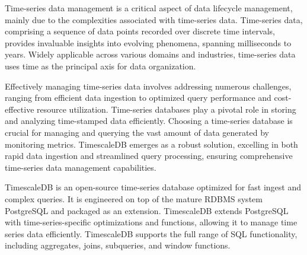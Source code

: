 


Time-series data management is a critical aspect of data lifecycle management, mainly due to the complexities associated with time-series data. Time-series data, comprising a sequence of data points recorded over discrete time intervals, provides invaluable insights into evolving phenomena, spanning milliseconds to years. Widely applicable across various domains and industries, time-series data uses time as the principal axis for data organization.

Effectively managing time-series data involves addressing numerous challenges, ranging from efficient data ingestion to optimized query performance and cost-effective resource utilization. Time-series databases play a pivotal role in storing and analyzing time-stamped data efficiently. Choosing a time-series database is crucial for managing and querying the vast amount of data generated by monitoring metrics. TimescaleDB \cite{timescaledb} emerges as a robust solution, excelling in both rapid data ingestion and streamlined query processing, ensuring comprehensive time-series data management capabilities.

TimescaleDB is an open-source time-series database optimized for fast ingest and complex queries. It is engineered on top of the mature RDBMS system PostgreSQL and packaged as an extension. TimescaleDB extends PostgreSQL with time-series-specific optimizations and functions, allowing it to manage time series data efficiently. TimescaleDB supports the full range of SQL functionality, including aggregates, joins, subqueries, and window functions.

